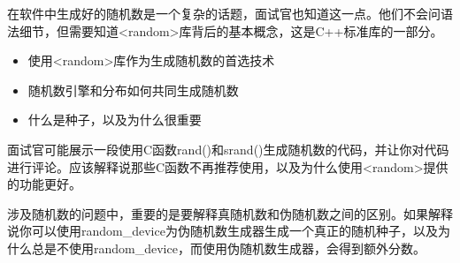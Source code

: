 
在软件中生成好的随机数是一个复杂的话题，面试官也知道这一点。他们不会问语法细节，但需要知道<random>库背后的基本概念，这是C++标准库的一部分。


\begin{itemize}
\item
使用<random>库作为生成随机数的首选技术

\item
随机数引擎和分布如何共同生成随机数

\item
什么是种子，以及为什么很重要
\end{itemize}


面试官可能展示一段使用C函数rand()和srand()生成随机数的代码，并让你对代码进行评论。应该解释说那些C函数不再推荐使用，以及为什么使用<random>提供的功能更好。

涉及随机数的问题中，重要的是要解释真随机数和伪随机数之间的区别。如果解释说你可以使用random\_device为伪随机数生成器生成一个真正的随机种子，以及为什么总是不使用random\_device，而使用伪随机数生成器，会得到额外分数。

